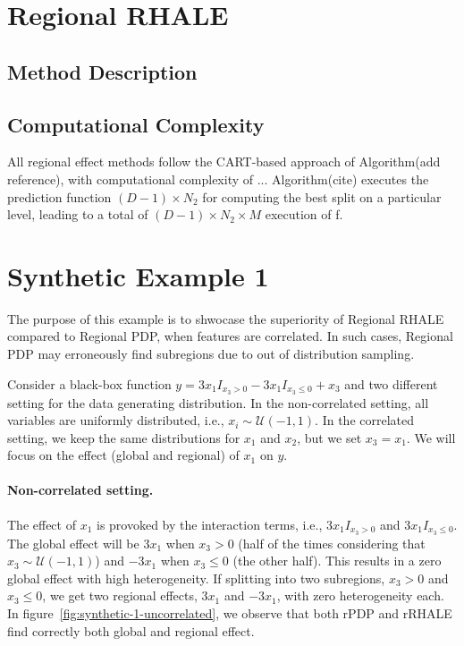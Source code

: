 \documentclass[
twocolumn,
]{ceurart}
\begin{document}
\section{Regional RHALE}



\subsection{Method Description}

\subsection{Computational Complexity}

All regional effect methods follow the CART-based approach of Algorithm(add reference), with computational complexity of ... Algorithm(cite) executes the prediction function $(D-1) \times N_2 $ for computing the best split on a particular level, leading to a total of $(D-1) \times N_2 \times M$ execution of f.


\section{Synthetic Example 1}

The purpose of this example is to shwocase the superiority of Regional RHALE compared to Regional PDP, when features are correlated. In such cases, Regional PDP may erroneously find subregions due to out of distribution sampling.

Consider a black-box function $y = 3x_1I_{x_3>0} - 3x_1I_{x_3\leq0} + x_3$ and two different setting for the data generating distribution. In the non-correlated setting, all variables are uniformly distributed, i.e., $x_i \sim \mathcal{U}(-1,1)$.
In the correlated setting, we keep the same distributions for $x_1$ and $x_2$, but we set $x_3 = x_1$. We will focus on the effect (global and regional) of $x_1$ on $y$.

\paragraph{Non-correlated setting.}

The effect of $x_1$ is provoked by the interaction terms, i.e., $3x_1I_{x_3>0}$ and $3x_1I_{x_3\leq0}$. The global effect will be $3x_1$ when $x_3>0$ (half of the times considering that $x_3 \sim \mathcal{U}(-1,1)$) and $-3x_1$ when $x_3 \leq 0$ (the other half). This results in a zero global effect with high heterogeneity. If splitting into two subregions, $x_3>0$ and $x_3 \leq 0$, we get two regional effects, $3x_1$ and $-3x_1$, with zero heterogeneity each. In figure~\ref{fig:synthetic-1-uncorrelated}, we observe that both rPDP and rRHALE find correctly both global and regional effect.
\end{document}
